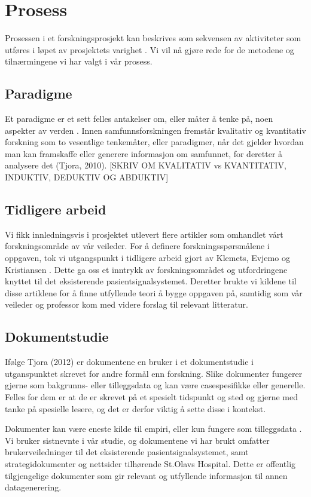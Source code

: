 \section{Prosess}
\label{chp: prosess}

Prosessen i et forskningsprosjekt kan beskrives som sekvensen av aktiviteter som utføres i løpet av prosjektets varighet \cite{Oates}. Vi vil nå gjøre rede for de metodene og tilnærmingene vi har valgt i vår prosess.

\subsection{Paradigme}
Et paradigme er et sett felles antakelser om, eller måter å tenke på, noen aspekter av verden \cite{Oates}. Innen samfunnsforskningen fremstår kvalitativ og kvantitativ forskning som to vesentlige tenkemåter, eller paradigmer, når det gjelder hvordan man kan framskaffe eller generere informasjon om samfunnet, for deretter å analysere det (Tjora, 2010).
[SKRIV OM KVALITATIV vs KVANTITATIV, INDUKTIV, DEDUKTIV OG ABDUKTIV]

\subsection{Tidligere arbeid}
Vi fikk innledningsvis i prosjektet utlevert flere artikler som omhandlet vårt forskningsområde av vår veileder. For å definere forskningsspørsmålene i oppgaven, tok vi utgangspunkt i tidligere arbeid gjort av Klemets, Evjemo og Kristiansen \cite{klemets13, Klemets12, KlemetsRedundancy}. Dette ga oss et inntrykk av forskningsområdet og utfordringene knyttet til det eksisterende pasientsignalsystemet. Deretter brukte vi kildene til disse artiklene for å finne utfyllende teori å bygge oppgaven på, samtidig som vår veileder og professor kom med videre forslag til relevant litteratur.  

\subsection{Dokumentstudie}
Ifølge Tjora (2012) er dokumentene en bruker i et dokumentstudie i utganspunktet skrevet for andre formål enn forskning. Slike dokumenter fungerer gjerne som bakgrunns- eller tilleggsdata og kan være casespesifikke eller generelle. Felles for dem er at de er skrevet på et spesielt tidspunkt og sted og gjerne med tanke på spesielle lesere, og det er derfor viktig å sette disse i kontekst. 

\noindent
Dokumenter kan være eneste kilde til empiri, eller kun fungere som tilleggsdata \cite{Tjora}. Vi bruker sistnevnte i vår studie, og dokumentene vi har brukt omfatter brukerveiledninger til det eksisterende pasientsignalsystemet, samt strategidokumenter og nettsider tilhørende St.Olavs Hospital. Dette er offentlig tilgjengelige dokumenter som gir relevant og utfyllende informasjon til annen datagenerering.


